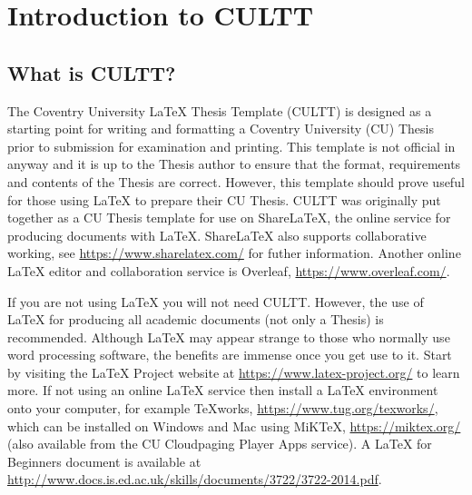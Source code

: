 
\chapter{Introduction to CULTT}  %

\ifpdf
    \graphicspath{{Chapter1/Figs/Raster/}{Chapter1/Figs/PDF/}{Chapter1/Figs/}}
\else
    \graphicspath{{Chapter1/Figs/Vector/}{Chapter1/Figs/}}
\fi

\section{What is CULTT?} %

The Coventry University \LaTeX{} Thesis Template (CULTT) is designed as a starting point for writing and formatting a Coventry University (CU) Thesis prior to submission for examination and printing. This template is not official in anyway and it is up to the Thesis author to ensure that the format, requirements and contents of the Thesis are correct. However, this template should prove useful for those using \LaTeX{} to prepare their CU Thesis. CULTT was originally put together as a CU Thesis template for use on ShareLaTeX, the online service for producing documents with \LaTeX{}. ShareLaTeX also supports collaborative working, see \url{https://www.sharelatex.com/} for futher information. Another online \LaTeX{} editor and collaboration service is Overleaf, \url{https://www.overleaf.com/}.

If you are not using \LaTeX{} you will not need CULTT. However, the use of \LaTeX{} for producing all academic documents (not only a Thesis) is recommended. Although \LaTeX{} may appear strange to those who normally use word processing software, the benefits are immense once you get use to it. Start by visiting the \LaTeX{} Project website at \url{https://www.latex-project.org/} to learn more. If not using an online \LaTeX{} service then install a \LaTeX{} environment onto your computer, for example TeXworks, \url{https://www.tug.org/texworks/}, which can be installed on Windows and Mac using MiKTeX, \url{https://miktex.org/} (also available from the CU Cloudpaging Player Apps service).  A \LaTeX{} for Beginners document is available at \url{http://www.docs.is.ed.ac.uk/skills/documents/3722/3722-2014.pdf}.

